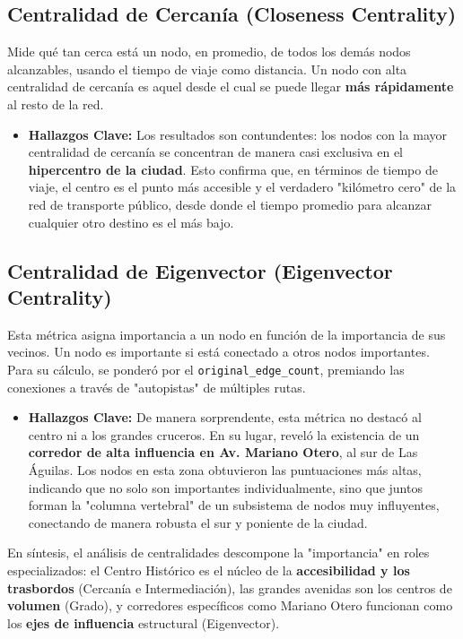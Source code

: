     \subsection{Centralidad de Cercanía (Closeness Centrality)}
    Mide qué tan cerca está un nodo, en promedio, de todos los demás nodos alcanzables, usando el tiempo de viaje como distancia. Un nodo con alta centralidad de cercanía es aquel desde el cual se puede llegar \textbf{más rápidamente} al resto de la red.
    \begin{itemize}
        \item \textbf{Hallazgos Clave:} Los resultados son contundentes: los nodos con la mayor centralidad de cercanía se concentran de manera casi exclusiva en el \textbf{hipercentro de la ciudad}. Esto confirma que, en términos de tiempo de viaje, el centro es el punto más accesible y el verdadero "kilómetro cero" de la red de transporte público, desde donde el tiempo promedio para alcanzar cualquier otro destino es el más bajo.
    \end{itemize}

    \subsection{Centralidad de Eigenvector (Eigenvector Centrality)}
    Esta métrica asigna importancia a un nodo en función de la importancia de sus vecinos. Un nodo es importante si está conectado a otros nodos importantes. Para su cálculo, se ponderó por el \texttt{original\_edge\_count}, premiando las conexiones a través de "autopistas" de múltiples rutas.
    \begin{itemize}
        \item \textbf{Hallazgos Clave:} De manera sorprendente, esta métrica no destacó al centro ni a los grandes cruceros. En su lugar, reveló la existencia de un \textbf{corredor de alta influencia en Av. Mariano Otero}, al sur de Las Águilas. Los nodos en esta zona obtuvieron las puntuaciones más altas, indicando que no solo son importantes individualmente, sino que juntos forman la "columna vertebral" de un subsistema de nodos muy influyentes, conectando de manera robusta el sur y poniente de la ciudad.
    \end{itemize}

    En síntesis, el análisis de centralidades descompone la "importancia" en roles especializados: el Centro Histórico es el núcleo de la \textbf{accesibilidad y los trasbordos} (Cercanía e Intermediación), las grandes avenidas son los centros de \textbf{volumen} (Grado), y corredores específicos como Mariano Otero funcionan como los \textbf{ejes de influencia} estructural (Eigenvector).

